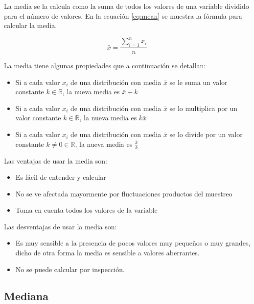 \documentclass[]{book}
\providecommand{\tightlist}{%
  \setlength{\itemsep}{0pt}\setlength{\parskip}{0pt}}
\begin{document}
La media se la calcula como la suma de todos los valores de una variable
dividido para el número de valores. En la ecuación \eqref{eq:mean} se
muestra la fórmula para calcular la media.

\begin{equation} 
  \bar{x} = \dfrac{\sum_{i=1}^{n}x_i}{n}
  \label{eq:mean}
\end{equation}

La media tiene algunas propiedades que a continuación se detallan:

\begin{itemize}
\tightlist
\item
  Si a cada valor \(x_i\) de una distribución con media \(\bar{x}\) se
  le suma un valor constante \(k \in \mathbb{R}\), la nueva media es
  \(\bar{x}+k\)
\item
  Si a cada valor \(x_i\) de una distribución con media \(\bar{x}\) se
  lo multiplica por un valor constante \(k \in \mathbb{R}\), la nueva
  media es \(k\bar{x}\)
\item
  Si a cada valor \(x_i\) de una distribución con media \(\bar{x}\) se
  lo divide por un valor constante \(k \neq 0 \in \mathbb{R}\), la nueva
  media es \(\frac{\bar{x}}{k}\)
\end{itemize}

Las ventajas de usar la media son:

\begin{itemize}
\tightlist
\item
  Es fácil de entender y calcular
\item
  No se ve afectada mayormente por fluctuaciones productos del muestreo
\item
  Toma en cuenta todos los valores de la variable
\end{itemize}

Las desventajas de usar la media son:

\begin{itemize}
\tightlist
\item
  Es muy sensible a la presencia de pocos valores muy pequeños o muy
  grandes, dicho de otra forma la media es sensible a valores
  aberrantes.
\item
  No se puede calcular por inspección.
\end{itemize}

\subsection{Mediana}\label{mediana}
\end{document}
